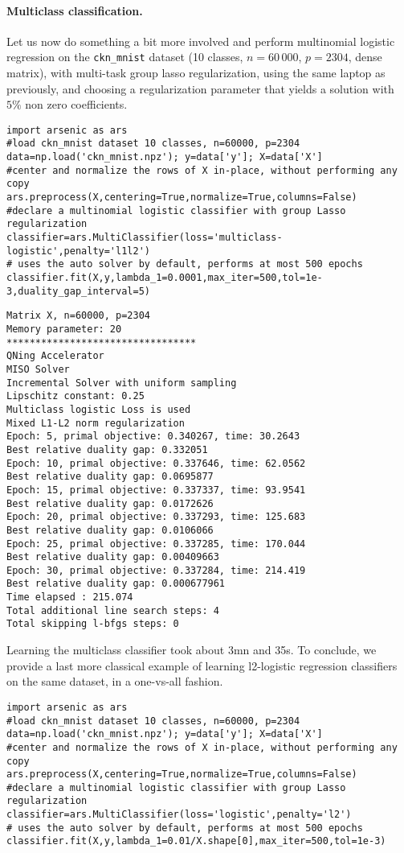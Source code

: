 \documentclass{article}
\begin{document}
\paragraph{Multiclass classification.}
Let us now do something a bit more involved and perform multinomial logistic regression on the
\texttt{ckn\_mnist} dataset (10 classes, $n=60\,000$, $p=2304$, dense matrix), with multi-task group lasso regularization,
using the same laptop as previously, and choosing a regularization parameter that yields a solution with $5\%$ non zero coefficients.
\begin{verbatim}
import arsenic as ars
#load ckn_mnist dataset 10 classes, n=60000, p=2304
data=np.load('ckn_mnist.npz'); y=data['y']; X=data['X']
#center and normalize the rows of X in-place, without performing any copy
ars.preprocess(X,centering=True,normalize=True,columns=False) 
#declare a multinomial logistic classifier with group Lasso regularization
classifier=ars.MultiClassifier(loss='multiclass-logistic',penalty='l1l2')
# uses the auto solver by default, performs at most 500 epochs
classifier.fit(X,y,lambda_1=0.0001,max_iter=500,tol=1e-3,duality_gap_interval=5) 
\end{verbatim}
\begin{verbatim}
Matrix X, n=60000, p=2304
Memory parameter: 20
*********************************
QNing Accelerator
MISO Solver
Incremental Solver with uniform sampling
Lipschitz constant: 0.25
Multiclass logistic Loss is used
Mixed L1-L2 norm regularization
Epoch: 5, primal objective: 0.340267, time: 30.2643
Best relative duality gap: 0.332051
Epoch: 10, primal objective: 0.337646, time: 62.0562
Best relative duality gap: 0.0695877
Epoch: 15, primal objective: 0.337337, time: 93.9541
Best relative duality gap: 0.0172626
Epoch: 20, primal objective: 0.337293, time: 125.683
Best relative duality gap: 0.0106066
Epoch: 25, primal objective: 0.337285, time: 170.044
Best relative duality gap: 0.00409663
Epoch: 30, primal objective: 0.337284, time: 214.419
Best relative duality gap: 0.000677961
Time elapsed : 215.074
Total additional line search steps: 4
Total skipping l-bfgs steps: 0
\end{verbatim}
Learning the multiclass classifier took about 3mn and 35s. To conclude, we provide a last more classical example
of learning l2-logistic regression classifiers on the same dataset, in a one-vs-all fashion.
\begin{verbatim}
import arsenic as ars
#load ckn_mnist dataset 10 classes, n=60000, p=2304
data=np.load('ckn_mnist.npz'); y=data['y']; X=data['X']
#center and normalize the rows of X in-place, without performing any copy
ars.preprocess(X,centering=True,normalize=True,columns=False) 
#declare a multinomial logistic classifier with group Lasso regularization
classifier=ars.MultiClassifier(loss='logistic',penalty='l2')
# uses the auto solver by default, performs at most 500 epochs
classifier.fit(X,y,lambda_1=0.01/X.shape[0],max_iter=500,tol=1e-3) 
\end{verbatim}
\end{document}
